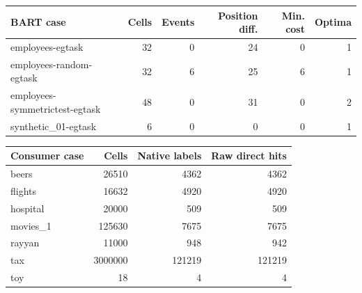 \begin{tabular}{lrrrrr}
\toprule
BART case & Cells & Events & Position diff. & Min. cost & Optima \\
\midrule
employees-egtask & 32 & 0 & 24 & 0 & 1 \\
employees-random-egtask & 32 & 6 & 25 & 6 & 1 \\
employees-symmetrictest-egtask & 48 & 0 & 31 & 0 & 2 \\
synthetic\_01-egtask & 6 & 0 & 0 & 0 & 1 \\
\bottomrule
\end{tabular}

\begin{tabular}{lrrr}
\toprule
Consumer case & Cells & Native labels & Raw direct hits \\
\midrule
beers & 26510 & 4362 & 4362 \\
flights & 16632 & 4920 & 4920 \\
hospital & 20000 & 509 & 509 \\
movies\_1 & 125630 & 7675 & 7675 \\
rayyan & 11000 & 948 & 942 \\
tax & 3000000 & 121219 & 121219 \\
toy & 18 & 4 & 4 \\
\bottomrule
\end{tabular}
